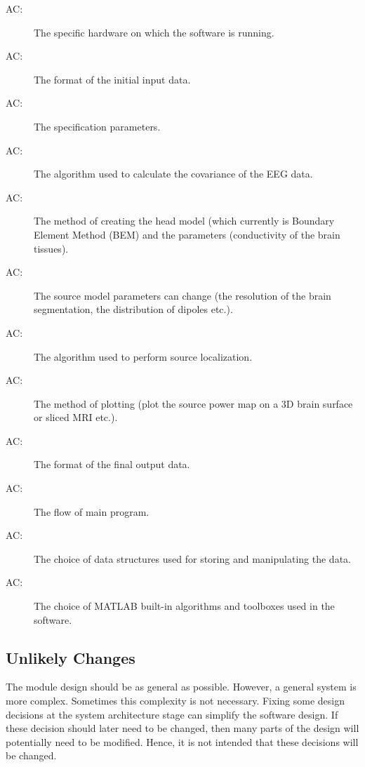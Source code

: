 \documentclass[12pt, titlepage]{article}
\newcounter{acnum}
\newcommand{\actheacnum}{AC\theacnum}
\begin{document}
\begin{description}
\item[ \actheacnum \label{acHW}:] The specific
  hardware on which the software is running.
\item[ \actheacnum \label{acInput}:] The format of the
  initial input data.
\item[ \actheacnum \label{acSpec}:] The specification parameters.
\item[ \actheacnum \label{acCov}:]  The algorithm used to calculate the covariance of the EEG data.
 \item[ \actheacnum \label{acHM}:] The method of creating the head model (which currently is Boundary Element Method (BEM) and the parameters (conductivity of the brain tissues).
 \item[ \actheacnum \label{acLF}:] The source model parameters can change (the resolution of the brain segmentation, the distribution of dipoles etc.).
 \item[ \actheacnum \label{acSL}:] The algorithm used to perform source localization.
\item[ \actheacnum \label{acPlot}:] The method of plotting (plot the source power map on a 3D brain surface or sliced MRI etc.).
\item[ \actheacnum \label{acOutput}:] The format of the final output data.
\item[ \actheacnum \label{acControl}:] The flow of main program.
\item[ \actheacnum \label{acDS}:] The choice of  data structures used for storing and manipulating the data.
\item[ \actheacnum \label{acAlg}:] The choice of MATLAB built-in algorithms and toolboxes used in the software. 
 
 \end{description}

\subsection{Unlikely Changes} \label{SecUchange}

The module design should be as general as possible. However, a general system is
more complex. Sometimes this complexity is not necessary. Fixing some design
decisions at the system architecture stage can simplify the software design. If
these decision should later need to be changed, then many parts of the design
will potentially need to be modified. Hence, it is not intended that these
decisions will be changed.
\end{document}
